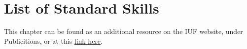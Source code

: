 \chapter{List of Standard Skills \label{chap:freestyle_std-skills-list}}
This chapter can be found as an additional resource on the IUF website, under Publicitions, or at this \href{https://unicycling.org/files/iuf-std_skills_list-2015.pdf}{link here}.